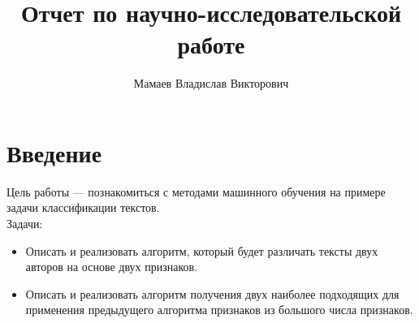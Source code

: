 \documentclass[%
bachelor,    %
subf,        %
href,        %
colorlinks,  %
]{disser}
\begin{document}

%
%



\title{Отчет по научно-исследовательской работе}


\author{Мамаев Владислав Викторович}

\date{\number\year}

\maketitle

%
%
%
%
%
%
%
%
%
%
%

\tableofcontents


\section{Введение}
Цель работы --- познакомиться с методами машинного обучения на примере задачи классификации текстов.\\
Задачи:
\begin{itemize}
\item Описать и реализовать алгоритм, который будет различать тексты двух авторов на основе двух признаков.
\item Описать и реализовать алгоритм получения двух наиболее подходящих для применения предыдущего алгоритма признаков из большого числа признаков.
\end{itemize}
\end{document}
